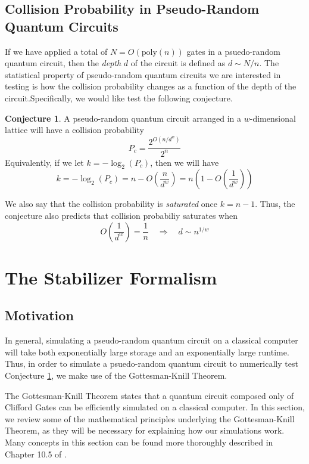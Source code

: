 \message{ !name(report_1.tex)}\documentclass[11pt]{article}
\theoremstyle{definition}
\newtheorem{conjecture}{Conjecture}
\theoremstyle{plain}
\begin{document}
\subsection{Collision Probability in Pseudo-Random Quantum Circuits}\label{cp_conjecture}
If we have applied a total of $N = O(\text{poly}(n))$ gates in a psuedo-random quantum circuit, then the \emph{depth} $d$ of the circuit is defined as $d \sim N / n$. The statistical property of pseudo-random quantum circuits we are interested in testing is how the collision probability changes as a function of the depth of the circuit.Specifically, we would like test the following conjecture. \\
\begin{conjecture}\label{conjecture_1}
  A pseudo-random quantum circuit arranged in a $w$-dimensional lattice will have a collision probability
  \begin{equation}
    P_c = \frac{2^{O(n/d^w)}}{2^n}
  \end{equation}
  Equivalently, if we let $k = - \log_2(P_c)$, then we will have
  \begin{equation}
    k = - \log_2(P_c) = n - O\left( \frac{n}{d^w} \right)
    = n \left(1 - O\left( \frac{1}{d^w} \right) \right)
  \end{equation}
\end{conjecture}
We also say that the collision probability is \emph{saturated} once $k = n - 1$. Thus, the conjecture also predicts that collision probabiliy saturates when
\begin{equation}
  O\left(\frac{1}{d^w} \right) = \frac{1}{n} \quad \Rightarrow \quad
  d \sim n^{1/w} 
\end{equation}


\section{The Stabilizer Formalism}

\subsection{Motivation}
In general, simulating a pseudo-random quantum circuit on a classical computer will take both exponentially large storage and an exponentially large runtime. Thus, in order to simulate a psuedo-random quantum circuit to numerically test Conjecture {\ref{conjecture_1}}, we make use of the Gottesman-Knill Theorem.

The Gottesman-Knill Theorem states that a quantum circuit composed only of Clifford Gates can be efficiently simulated on a classical computer. In this section, we review some of the mathematical principles underlying the Gottesman-Knill Theorem, as they will be necessary for explaining how our simulations work. Many concepts in this section can be found more thoroughly described in Chapter 10.5 of {\cite{nc}}. 
\end{document}
